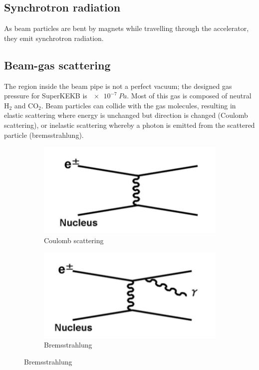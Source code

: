 \documentclass[12pt]{thesis}  %
\begin{document}
\subsection{Synchrotron radiation}

As beam particles are bent by magnets while travelling through the accelerator, they emit synchrotron radiation.

\subsection{Beam-gas scattering}	

The region inside the beam pipe is not a perfect vacuum; the designed gas pressure for SuperKEKB is $\SI{e-7}{Pa}$. Most of this gas is composed of neutral H$_2$ and CO$_2$. Beam particles can collide with the gas molecules, resulting in elastic scattering where energy is unchanged but direction is changed (Coulomb scattering), or inelastic scattering whereby a photon is emitted from the scattered particle (bremsstrahlung).

  \begin{figure}[h]
        \centering
        \begin{subfigure}[b]{0.475\textwidth}
            \centering
            \includegraphics[width=\textwidth]{images/coulomb-scattering.png}
            \caption[Network2]%
            {{\small Coulomb scattering}}    
            \label{fig:mean and std of net14}
        \end{subfigure}
        \hfill
        \begin{subfigure}[b]{0.475\textwidth}  
            \centering 
            \includegraphics[width=\textwidth]{images/bremsstrahlung.png}
            \caption[]%
            {{\small Bremsstrahlung}}    
            \label{fig:mean and std of net24}
        \end{subfigure}
    \end{figure}
\end{document}
